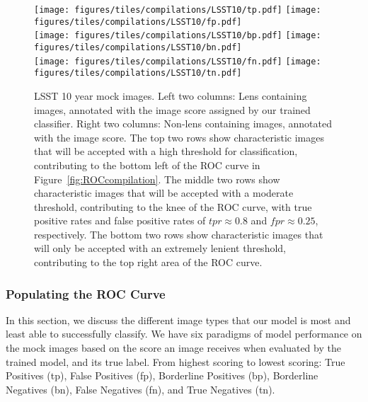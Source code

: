 \documentclass{emulateapj}
\begin{document}
\begin{figure*}[t]
\begin{center}
\texttt{[image: figures/tiles/compilations/LSST10/tp.pdf]}\hspace{5pt}
\texttt{[image: figures/tiles/compilations/LSST10/fp.pdf]}\\\vspace{5pt}
\texttt{[image: figures/tiles/compilations/LSST10/bp.pdf]}\hspace{5pt}
\texttt{[image: figures/tiles/compilations/LSST10/bn.pdf]}\\\vspace{5pt}
\texttt{[image: figures/tiles/compilations/LSST10/fn.pdf]}\hspace{5pt}
\texttt{[image: figures/tiles/compilations/LSST10/tn.pdf]}\\
\caption{LSST 10 year mock images. Left two columns: Lens containing
  images, annotated with the image score assigned by our trained
  classifier.  Right two columns: Non-lens containing images,
  annotated with the image score.  The top two rows show
  characteristic images that will be accepted with a high threshold
  for classification, contributing to the bottom left of the ROC curve
  in Figure~\ref{fig:ROCcompilation}.  The middle two rows show
  characteristic images that will be accepted with a moderate
  threshold, contributing to the knee of the ROC curve, with true
  positive rates and false positive rates of $tpr\approx0.8$ and
  $fpr\approx0.25$, respectively.  The bottom two rows show
  characteristic images that will only be accepted with an extremely
  lenient threshold, contributing to the top right area of the ROC
  curve.}\label{fig:ROCsamplesLSST10}
\end{center}
\end{figure*}

\subsubsection{Populating the ROC Curve}
In this section, we discuss the different image types that our model
is most and least able to successfully classify.  We have six
paradigms of model performance on the mock images based on the score
an image receives when evaluated by the trained model, and its true
label.  From highest scoring to lowest scoring: True Positives (tp),
False Positives (fp), Borderline Positives (bp), Borderline Negatives
(bn), False Negatives (fn), and True Negatives (tn).
\end{document}
